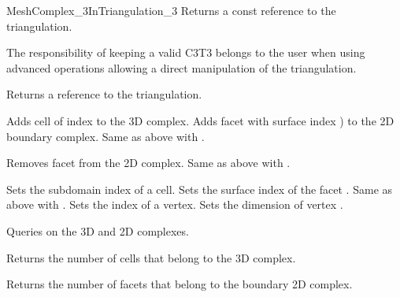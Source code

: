 \begin{ccRefConcept}{MeshComplex_3InTriangulation_3}
\ccAccessFunctions
{}
{Returns a const reference to the triangulation.}

\begin{ccAdvanced}
The responsibility of keeping a valid C3T3 belongs to the user when using
advanced operations allowing a direct manipulation of the triangulation.

{Returns a reference to the triangulation.}
\end{ccAdvanced}

\ccModifiers

{Adds cell  of index  to the 3D complex.}
\ccGlue
{}
{Adds facet  with surface index ) to the 2D boundary complex.}
\ccGlue
{}
{Same as above with .}

\ccGlue
{}
{Removes facet  from  the 2D complex.}
\ccGlue
{}
{Same as above with .}


{Sets the subdomain index of a cell.}
\ccGlue
{}
{Sets the surface index of the facet .}
\ccGlue
{}
{Same as above with .}
\ccGlue
{}
{Sets the index of a vertex.}
\ccGlue
{}
{Sets the dimension of vertex .}

Queries on the  3D and  2D  complexes.

{Returns the number of cells that belong to the 3D complex.}

{Returns the number of facets that belong to the boundary 2D complex.}





\end{ccRefConcept}
